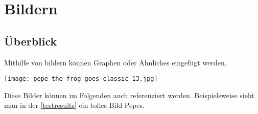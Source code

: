 \section{Bildern}

\subsection{Überblick}
Mithilfe von bildern können Graphen oder Ähnliches eingefügt werden. 
\begin{center}
\captionsetup{type=figure}
\texttt{[image: pepe-the-frog-goes-classic-13.jpg]}
\label{testresults}
\end{center}
Diese Bilder können im Folgenden auch referenziert werden. Beispielsweise sieht man in der \autoref{testresults} ein tolles Bild Pepes.
